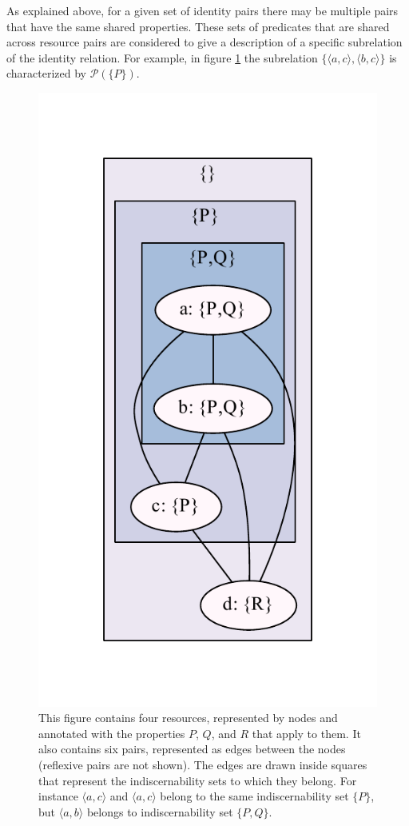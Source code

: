 \documentclass[letterpaper]{article}
\begin{document}
As explained above, for a given set of identity pairs there may be multiple pairs that have the same shared properties. These sets of predicates that are shared across resource pairs are considered to give a description of a specific subrelation of the identity relation. For example, in figure \ref{fig:indiscernibility_example} the subrelation $\{ \langle a, c \rangle, \langle b, c \rangle \}$ is characterized by $\mathcal{P}(\{ P \})$.

\begin{figure}
\caption{This figure contains four resources, represented by nodes and annotated with the properties $P$, $Q$, and $R$ that apply to them. It also contains six pairs, represented as edges between the nodes (reflexive pairs are not shown). The edges are drawn inside squares that represent the indiscernability sets to which they belong. For instance $\langle a, c \rangle$ and $\langle a, c \rangle$ belong to the same indiscernability set $\{ P \}$, but $\langle a, b \rangle$ belongs to indiscernability set $\{P, Q\}$.}
\label{fig:indiscernibility_example}
\includegraphics{indiscernibility_example}
\end{figure}
\end{document}
